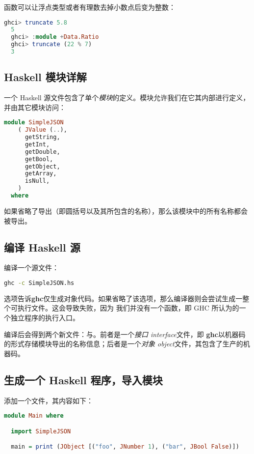 \documentclass[./main.tex]{subfiles}
\begin{document}
函数可以让浮点类型或者有理数去掉小数点后变为整数：

\begin{lstlisting}[language=Haskell]
  ghci> truncate 5.8
  5
  ghci> :module +Data.Ratio
  ghci> truncate (22 % 7)
  3
\end{lstlisting}

\subsection*{Haskell 模块详解}

一个 Haskell 源文件包含了单个\textit{模块}的定义。模块允许我们在它其内部进行定义，并由其它模块访问：

\begin{lstlisting}[language=Haskell]
  module SimpleJSON
    ( JValue (..),
      getString,
      getInt,
      getDouble,
      getBool,
      getObject,
      getArray,
      isNull,
    )
  where
\end{lstlisting}

如果省略了导出（即圆括号以及其所包含的名称），那么该模块中的所有名称都会被导出。

\subsection*{编译 Haskell 源}

编译一个源文件：

\begin{lstlisting}[language=Bash]
  ghc -c SimpleJSON.hs
\end{lstlisting}

选项告诉\textbf{ghc}仅生成对象代码。如果省略了该选项，那么编译器则会尝试生成一整个可执行文件。这会导致失败，因为
我们并没有一个函数，即 GHC 所认为的一个独立程序的执行入口。

编译后会得到两个新文件：与。前者是一个\textit{接口 interface}文件，即
\textbf{ghc}以机器码的形式存储模块导出的名称信息；后者是一个\textit{对象 object}文件，其包含了生产的机器码。

\subsection*{生成一个 Haskell 程序，导入模块}

添加一个文件，其内容如下：

\begin{lstlisting}[language=Haskell]
  module Main where

  import SimpleJSON

  main = print (JObject [("foo", JNumber 1), ("bar", JBool False)])
\end{lstlisting}
\end{document}
